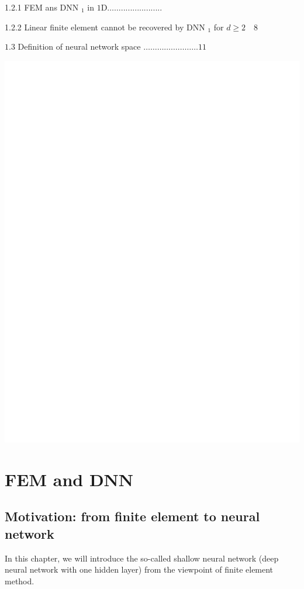 \documentclass[10pt]{article}
\begin{document}
1.2.1 FEM ans DNN $_{1}$ in $1 \mathrm{D} \ldots \ldots . . . . . . . . . . . . . . . . . .$

1.2.2 Linear finite element cannot be recovered by DNN $_{1}$ for $d \geq 2 \quad 8$

$1.3$ Definition of neural network space $\ldots \ldots \ldots \ldots \ldots \ldots \ldots \ldots 11$

\includegraphics[max width=\textwidth]{2022_01_05_e65f0d6bf0db4974ee45g-04}

\section{FEM and DNN}
\subsection{Motivation: from finite element to neural network}
In this chapter, we will introduce the so-called shallow neural network (deep neural network with one hidden layer) from the viewpoint of finite element method.
\end{document}
